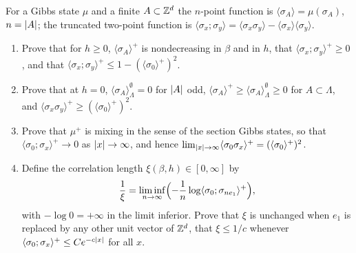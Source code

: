 \begin{exercise}
For a Gibbs state $\mu$ and a finite $A\subset\mathbb Z^d$ the $n$-point function
is $\langle\sigma_A\rangle=\mu(\sigma_A)$, $n=\left\lvert A\right\rvert$; the truncated two-point
function is $\langle\sigma_x;\sigma_y\rangle=\langle\sigma_x\sigma_y\rangle-\langle\sigma_x\rangle\langle\sigma_y\rangle$.
\begin{enumerate}[label=(\alph*)]
\item Prove that for $h\ge0$, $\langle\sigma_A\rangle^+$ is nondecreasing in
$\beta$ and in $h$, that $\langle\sigma_x;\sigma_y\rangle^+\ge0$, and that
$\langle\sigma_x;\sigma_y\rangle^+\le1-(\langle\sigma_0\rangle^+)^2$.
\item Prove that at $h=0$, $\langle\sigma_A\rangle^\emptyset_\Lambda=0$ for
$\left\lvert A\right\rvert$ odd, $\langle\sigma_A\rangle^+\ge\langle\sigma_A\rangle^\emptyset_\Lambda\ge0$
for $A\subset\Lambda$, and $\langle\sigma_x\sigma_y\rangle^+\ge(\langle\sigma_0\rangle^+)^2$.
\item Prove that $\mu^+$ is mixing in the sense of the section Gibbs states,
so that $\langle\sigma_0;\sigma_x\rangle^+\to0$ as $\left\lvert x\right\rvert\to\infty$, and hence
$\lim_{\left\lvert x\right\rvert\to\infty}\langle\sigma_0\sigma_x\rangle^+=(\langle\sigma_0\rangle^+)^2$.
\item Define the correlation length $\xi(\beta,h)\in[0,\infty]$ by
\[
 \frac1{\xi}=\liminf_{n\to\infty}\Bigl(-\frac1n\log\langle\sigma_0;\sigma_{ne_1}\rangle^+\Bigr),
\]
with $-\log0=+\infty$ in the limit inferior.  Prove that $\xi$ is unchanged when $e_1$ is replaced by any other unit
vector of $\mathbb Z^d$, that $\xi\le1/c$ whenever
$\langle\sigma_0;\sigma_x\rangle^+\le Ce^{-c\left\lvert x\right\rvert}$ for all $x$.
\end{enumerate}
\end{exercise}

